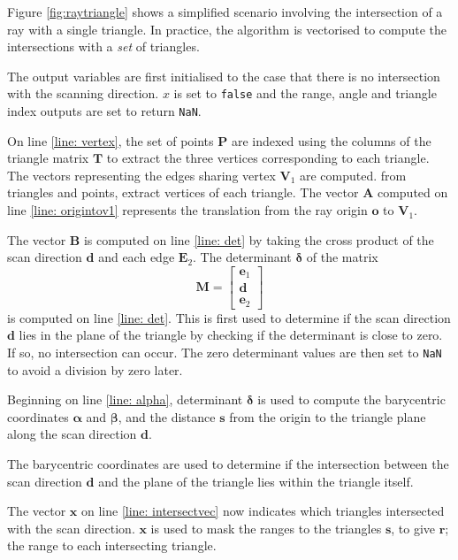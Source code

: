 	Figure \ref{fig:raytriangle} shows a simplified scenario involving the intersection of a ray with a single triangle. In practice, the algorithm is vectorised to compute the intersections with a \textit{set} of triangles.
	 
	
	The output variables are first initialised to the case that there is no intersection with the scanning direction. $x$ is set to \texttt{false} and the range, angle and triangle index outputs are set to return \texttt{NaN}.
	
	On line \ref{line: vertex}, the set of points $\mathbf{P}$ are indexed using the columns of the triangle matrix $\mathbf{T}$ to extract the three vertices corresponding to each triangle.
	The vectors representing the edges sharing vertex $\mathbf{V}_1$ are computed.
	from triangles and points, extract vertices of each triangle.
	The vector $\mathbf{A}$ computed on line \ref{line: origintov1} represents the translation from the ray origin $\mathbf{o}$ to $\mathbf{V}_1$.
	
	The vector $\mathbf{B}$ is computed on line \ref{line: det} by taking the cross product of the scan direction $\mathbf{d}$ and each edge $\mathbf{E}_2$. The determinant $\bm{\delta}$ of the matrix
	\begin{equation}
		\mathbf{M} = 
			\begin{bmatrix} 
				\mathbf{e}_1 \\
				\mathbf{d}	 \\
				\mathbf{e}_2
			\end{bmatrix}
	\end{equation}
	is computed on line \ref{line: det}. This is first used to determine if the scan direction $\mathbf{d}$ lies in the plane of the triangle by checking if the determinant is close to zero. If so, no intersection can occur. The zero determinant values are then set to \texttt{NaN} to avoid a division by zero later.
	
	Beginning on line \ref{line: alpha}, determinant $\bm{\delta}$ is used to compute the barycentric coordinates $\bm{\alpha}$ and  $\bm{\beta}$, and the distance $\mathbf{s}$ from the origin to the triangle plane along the scan direction $\mathbf{d}$.
	
	The barycentric coordinates are used to determine if the intersection between the scan direction $\mathbf{d}$ and the plane of the triangle lies within the triangle itself. 
	
	The vector $\mathbf{x}$ on line \ref{line: intersectvec} now indicates which triangles intersected with the scan direction. $\mathbf{x}$ is used to mask the ranges to the triangles $\mathbf{s}$, to give $\mathbf{r}$; the range to each intersecting triangle. 
	
